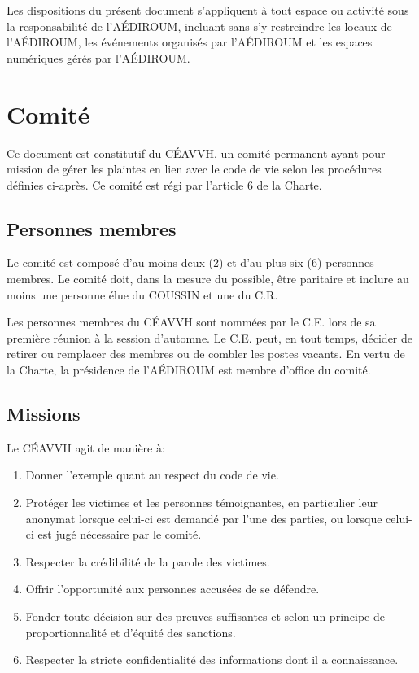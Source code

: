 \documentclass{aediroum}
\begin{document}
Les dispositions du présent document s’appliquent à tout espace ou activité sous la responsabilité de l’AÉDIROUM, incluant sans s’y restreindre les locaux de l’AÉDIROUM, les événements organisés par l’AÉDIROUM et les espaces numériques gérés par l’AÉDIROUM.

\section{Comité}

Ce document est constitutif du CÉAVVH, un comité permanent ayant pour mission de gérer les plaintes en lien avec le code de vie selon les procédures définies ci-après. Ce comité est régi par l’article 6 de la Charte.

\subsection{Personnes membres}

Le comité est composé d’au moins deux (2) et d’au plus six (6) personnes membres. Le comité doit, dans la mesure du possible, être paritaire et inclure au moins une personne élue du COUSSIN et une du C.R.

Les personnes membres du CÉAVVH sont nommées par le C.E. lors de sa première réunion à la session d’automne. Le C.E. peut, en tout temps, décider de retirer ou remplacer des membres ou de combler les postes vacants. En vertu de la Charte, la présidence de l’AÉDIROUM est membre d’office du comité.

\subsection{Missions}

Le CÉAVVH agit de manière à:

\begin{enumerate}
    \item Donner l’exemple quant au respect du code de vie.
    \item Protéger les victimes et les personnes témoignantes, en particulier leur anonymat lorsque celui-ci est demandé par l’une des parties, ou lorsque celui-ci est jugé nécessaire par le comité.
    \item Respecter la crédibilité de la parole des victimes.
    \item Offrir l’opportunité aux personnes accusées de se défendre.
    \item Fonder toute décision sur des preuves suffisantes et selon un principe de proportionnalité et d’équité des sanctions.
    \item Respecter la stricte confidentialité des informations dont il a connaissance.
\end{enumerate}
\end{document}
